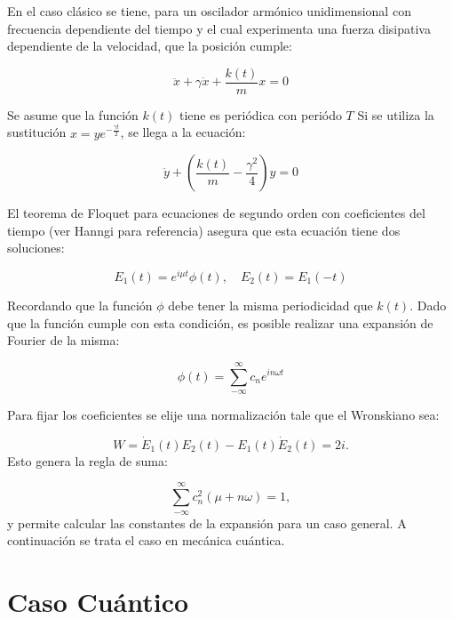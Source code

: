 \documentclass[a4paper,10pt]{report}
\begin{document}
En el caso clásico \cite{HanngiFM} se tiene, para un oscilador armónico unidimensional con frecuencia dependiente del tiempo y el cual experimenta una fuerza disipativa dependiente de la velocidad, que la posición cumple:

\begin{equation}
\ddot{x}+\gamma\dot{x}+\frac{k(t)}{m}x=0
\end{equation}

Se asume que la función $k(t)$ tiene es periódica con periódo $T$ Si se utiliza la sustitución $x=ye^{-\frac{\gamma t}{2}}$, se llega a la ecuación:

\begin{equation}
\ddot{y} +(\frac{k(t)}{m}-\frac{\gamma^2}{4})y=0
\end{equation}

El teorema de Floquet para ecuaciones de segundo orden con coeficientes del tiempo (ver Hanngi para referencia) asegura que esta ecuación tiene dos soluciones:


\begin{equation}
E_1(t) = e^{i\mu t}\phi(t), \quad E_2(t)=E_1(-t)
\end{equation}

Recordando que la función $\phi$ debe tener la misma periodicidad que $k(t)$. Dado que la función cumple con esta condición, es posible realizar una expansión de Fourier \cite{ArfkenMM} de la misma:

\begin{equation}
\phi(t) = \sum_{-\infty}^\infty c_n e^{in\omega t}
\end{equation}

Para fijar los coeficientes se elije una normalización tale que el Wronskiano sea:

\begin{equation}
W = \dot{E}_1(t)E_2(t)-E_1(t)\dot{E}_2(t) = 2i.
\end{equation}Esto genera la regla de suma:

\begin{equation}
\sum_{-\infty}^\infty c_n^2(\mu + n\omega) = 1,
\end{equation} y permite calcular las constantes de la expansión para un caso general. A continuación se trata el caso en mecánica cuántica.

\section{Caso Cuántico}
\end{document}
